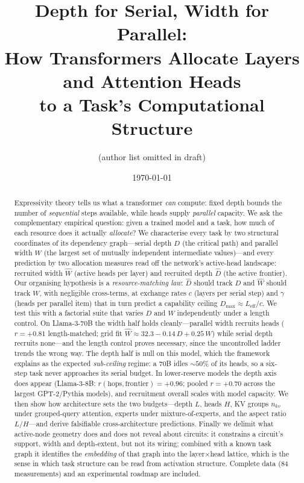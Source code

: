 \documentclass[11pt]{article}
\title{\textbf{Depth for Serial, Width for Parallel:\\
How Transformers Allocate Layers and Attention Heads\\
to a Task's Computational Structure}}
\author{(author list omitted in draft)}
\date{\today}
\newcommand{\Dh}{\hat{D}}
\newcommand{\Wh}{\hat{W}}
\begin{document}
\maketitle

\begin{abstract}
Expressivity theory tells us what a transformer \emph{can} compute: fixed
depth bounds the number of \emph{sequential} steps available, while heads
supply \emph{parallel} capacity. We ask the complementary empirical question:
given a trained model and a task, how much of each resource does it actually
\emph{allocate}? We characterise every task by two structural coordinates of
its dependency graph---serial depth $D$ (the critical path) and parallel
width $W$ (the largest set of mutually independent intermediate values)---and
every prediction by two allocation measures read off the network's
active-head landscape: recruited width $\Wh$ (active heads per layer) and
recruited depth $\Dh$ (the active frontier). Our organising hypothesis is a
\emph{resource-matching law}: $\Dh$ should track $D$ and $\Wh$ should track
$W$, with negligible cross-terms, at exchange rates $c$ (layers per serial
step) and $\gamma$ (heads per parallel item) that in turn predict a capability
ceiling $D_{\max}\approx L_{\text{eff}}/c$. We test this with a factorial
suite that varies $D$ and $W$ independently under a length control.
On Llama-3-70B the width half holds cleanly---parallel width recruits heads
($r{=}{+}0.81$ length-matched; grid fit $\Wh \approx 32.3-0.14\,D+0.25\,W$)
while serial depth recruits none---and the length control proves necessary,
since the uncontrolled ladder trends the wrong way. The depth half is null on
this model, which the framework explains as the expected \emph{sub-ceiling}
regime: a 70B idles ${\sim}50\%$ of its heads, so a six-step task never
approaches its serial budget. In lower-reserve models the depth axis does
appear (Llama-3-8B: $r(\text{hops},\text{frontier}){=}{+}0.96$; pooled
$r{=}{+}0.70$ across the largest GPT-2/Pythia models), and recruitment
overall scales with model capacity. We then show how architecture sets the
two budgets---depth $L$, heads $H$, KV groups $n_{kv}$ under grouped-query
attention, experts under mixture-of-experts, and the aspect ratio $L/H$---and
derive falsifiable cross-architecture predictions. Finally we delimit what
active-node geometry does and does not reveal about circuits: it constrains a
circuit's support, width and depth-extent, but not its wiring; combined with a
known task graph it identifies the \emph{embedding} of that graph into the
layer$\times$head lattice, which is the sense in which task structure can be
read from activation structure. Complete data (84 measurements) and an
experimental roadmap are included.
\end{abstract}
\end{document}
